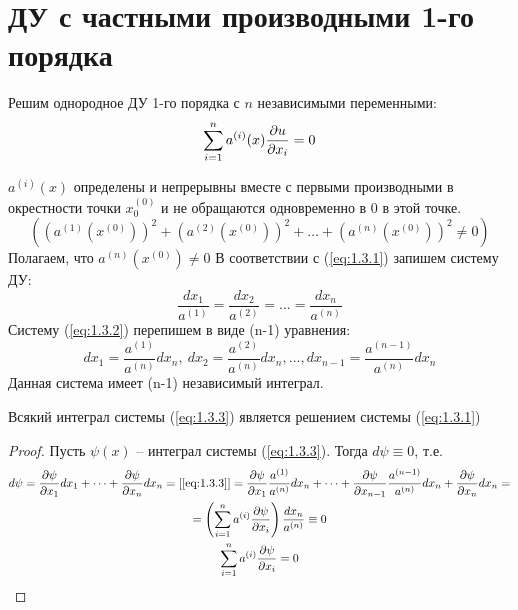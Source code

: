 \documentclass[../main.tex]{subfiles}
\begin{document}
\section{ДУ с частными производными 1-го порядка}
Решим однородное ДУ 1-го порядка с $n$ независимыми переменными:
\begin{equation}
	\label{eq:1.3.1}
	\sum_{i=1}^n a^{(i)}(x)\frac{\partial u}{\partial x_i} = 0
\end{equation}

$a^{(i)}(x)$ определены и непрерывны вместе с первыми производными в
окрестности точки $x_0^{(0)}$ и не обращаются одновременно в $0$ в этой точке.
\[
	\left((a^{(1)}(x^{(0)}))^2 + (a^{(2)}(x^{(0)}))^2 + \dots + (a^{(n)}(x^{(0)}))^2 \neq 0\right)
\]
Полагаем, что $a^{(n)}(x^{(0)})\neq 0$
В соответствии с (\ref*{eq:1.3.1}) запишем систему ДУ:
\begin{equation}
	\label{eq:1.3.2}
	\frac{dx_1}{a^{(1)}} = \frac{dx_2}{a^{(2)}} = \dots = \frac{dx_n}{a^{(n)}}
\end{equation}
Систему (\ref*{eq:1.3.2}) перепишем в виде (n-1) уравнения:
\begin{equation}
	\label{eq:1.3.3}
	dx_1 = \frac{a^{(1)}}{a^{(n)}}dx_n, \:
	dx_2 = \frac{a^{(2)}}{a^{(n)}}dx_n,
	\dots,
	dx_{n-1} = \frac{a^{(n-1)}}{a^{(n)}}dx_n
\end{equation}
Данная система имеет (n-1) независимый интеграл.
\begin{theorem}
	Всякий интеграл системы (\ref*{eq:1.3.3}) является решением системы (\ref*{eq:1.3.1})
\end{theorem}
\begin{proof}
	Пусть $\psi(x)$ -- интеграл системы (\ref*{eq:1.3.3}). Тогда $d\psi \equiv 0$,
	т.е.
	\begin{gather*}
		d\psi = \pderiv{\psi}{x_1}dx_1 + \dots + \pderiv{\psi}{x_n}dx_n = [\ref*{eq:1.3.3}] =
		\pderiv{\psi}{x_1}\frac{a^{(1)}}{a^{(n)}}dx_n + \dots
		+ \pderiv{\psi}{x_{n-1}}\frac{a^{(n-1)}}{a^{(n)}}dx_n + \pderiv{\psi}{x_n}dx_n = \\
		= \left(\sum_{i=1}^{n}a^{(i)}\pderiv{\psi}{x_i}\right)\frac{dx_n}{a^{(n)}} \equiv 0\\
		\sum_{i=1}^{n}a^{(i)}\pderiv{\psi}{x_i} = 0
	\end{gather*}
\end{proof}
\end{document}
